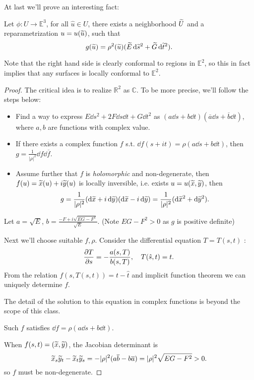 At last we'll prove an interesting fact:
\begin{proposition}
	Let $\phi: U\to \mathbb{E}^{3}$, for all $\hat{u}\in U$, there exists
	a neighborhood $\widetilde{U}$ and a reparametrization $u = u(\widetilde{u})$,
	such that
	\[
	g(\widetilde{u}) = \rho^2(\widetilde{u})(\widetilde{E}\mathop{}\!\mathrm{d} \widetilde{s}^2 + \widetilde{G}\mathop{}\!\mathrm{d} \widetilde{t}^2).
	\]
\end{proposition}
\begin{remark}
    Note that the right hand side is clearly conformal to regions in $\mathbb{E}^2$,
	so this in fact implies that any surfaces is locally conformal to
	$\mathbb{E}^2$.
\end{remark}
\begin{proof}[Proof]
    The critical idea is to realize $\mathbb{R}^2$ as $\mathbb{C}$.
	To be more precise, we'll follow the steps below:
	\begin{itemize}
		\item Find a way to express $E\dd s^2 + 2F\dd s\dd t + G\dd t^2$
			as $(a\dd s + b\dd t)(\overline{a}\dd s + \overline{b}\dd t)$,
			where $a,b$ are functions with complex value.

		\item If there exists a complex function $f$ s.t.
			$\dd f(s+it) = \rho(a\dd s+b\dd t)$,
			then $g = \frac{1}{|\rho|^2}\dd f\dd \overline{f}$.

		\item Assume further that $f$ is \textit{holomorphic} and non-degenerate,
			then $f(u) = \widetilde{x}(u) + i\widetilde{y}(u)$ is locally inversible,
			i.e. exists $u = u(\widetilde{x}, \widetilde{y})$, then
			\[
			g = \frac{1}{|\rho|^2}(\mathop{}\!\mathrm{d} \widetilde{x} + i\mathop{}\!\mathrm{d} \widetilde{y})(\mathop{}\!\mathrm{d} \widetilde{x} - i\mathop{}\!\mathrm{d} \widetilde{y})
			= \frac{1}{|\rho|^2}(\mathop{}\!\mathrm{d} \widetilde{x}^2 + \mathop{}\!\mathrm{d} \widetilde{y}^2).
			\]
	\end{itemize}

	Let $a = \sqrt{E}$, $b = \frac{-F + i\sqrt{EG - F^2}}{\sqrt{E}}$.
	(Note $EG - F^2>0$ as $g$ is positive definite)

	Next we'll choose suitable $f,\rho$.
	Consider the differential equation $T = T(s,t)$ :
	\[
	\frac{\partial T}{\partial s} = - \frac{a(s,T)}{b(s,T)},\quad T(\hat{s}, t) = t.
	\]
	From the relation $f(s, T(s,t)) = t - \hat{t}$ and implicit function theorem
	we can uniquely determine $f$.
	\begin{remark}
	    The detail of the solution to this equation in complex functions is
		beyond the scope of this class.
	\end{remark}
	Such $f$ satisfies $\dd f = \rho(a\dd s + b\dd t)$.

	When $f(s,t) = (\widetilde{x}, \widetilde{y})$, the Jacobian determinant is
	\[
	\widetilde{x}_s\widetilde{y}_t - \widetilde{x}_t\widetilde{y}_s
	= - |\rho|^2(a\overline{b} - b\overline{a}) = |\rho|^2\sqrt{EG-F^2}>0.
	\]
	so $f$ must be non-degenerate.
\end{proof}
